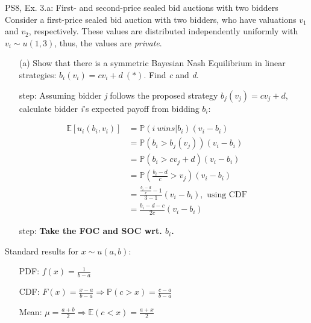 \begin{frame}{PS8, Ex. 3.a: First- and second-price sealed bid auctions with two bidders}
    Consider a first-price sealed bid auction with two bidders, who have valuations $v_1$ and $v_2$, respectively. These values are distributed independently uniformly with $v_i\sim u(1,3)$, thus, the values are \textit{private}.
    \vspace{-4pt}
    \begin{itemize}
      \item[(a)] Show that there is a symmetric Bayesian Nash Equilibrium in linear strategies: $b_i(v_i) = cv_i + d\ (*)$. Find \textit{c} and \textit{d}.
    \end{itemize}
    \vspace{-8pt}
    \begin{multicols}{2}
      \begin{itemize}
        \item[\nth{1} step:] Assuming bidder \textit{j} follows the proposed strategy $b_j(v_j) = cv_j + d$, calculate bidder \textit{i}'s expected payoff from bidding $b_i$:
      \end{itemize}
      \vspace{-4pt}
      \begin{align*}
        \mathbb{E}[u_i(b_i,v_i)]&=\mathbb{P}(i\ wins|b_i)(v_i-b_i)\\
                                &=\mathbb{P}(b_i>b_j(v_j))(v_i-b_i)\\
                                &=\mathbb{P}(b_i>cv_j+d)(v_i-b_i)\\
                                &=\mathbb{P}\left(\frac{b_i-d}{c}>v_j\right)(v_i-b_i)\\
                                &=\frac{\frac{b_i-d}{c}-1}{3-1}(v_i-b_i),\text{ using CDF}\\
                                &=\frac{b_i-d-c}{2c}(v_i-b_i)
      \end{align*}
      \vspace{-10pt}
      \begin{itemize}
        \item[\nth{2} step:] \textbf{Take the FOC and SOC wrt. $b_i$.}
      \end{itemize}
      \vfill\null\columnbreak
      Standard results for $x\sim u(a, b):$
      \vspace{-6pt}
      \begin{enumerate}
        \item[PDF:] $f(x)=\frac{1}{b-a}$
        \item[CDF:] $F(x)=\frac{x-a}{b-a}\Rightarrow\mathbb{P}(c>x)=\frac{c-a}{b-a}$
        \item[Mean:] $\mu=\frac{a+b}{2}\Rightarrow\mathbb{E}(c<x)=\frac{a+x}{2}$
      \end{enumerate}
      \vfill\null
    \end{multicols}
\end{frame}
